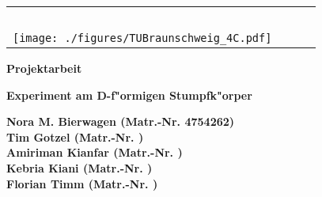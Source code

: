 \begin{titlepage}
 \centering

\begin{table}[htbp]
 \begin{center}
 \vspace{-0.5cm}
  \begin{tabular}{lcr} 
    \parbox{0.45\textwidth}{\mbox{ }} & \parbox{0.13\textwidth}{\mbox{ }} & \parbox{0.45\textwidth}{\mbox{ }} \\
    \hspace*{-2.0cm}
    \texttt{[image: ./figures/TUBraunschweig\_4C.pdf]} & 
     &  \\ %
  \end{tabular}
 \end{center}
\end{table}


 \vspace*{2.0cm}

 \textbf{\large Projektarbeit}


 \vspace*{1.5cm}
 
 \textbf{\LARGE Experiment am D-f"ormigen Stumpfk"orper} \\[0.5ex]
 


 \vspace*{1.5cm}

 \textbf{\large Nora M. Bierwagen (Matr.-Nr. 4754262)} \\
 \textbf{\large Tim Gotzel (Matr.-Nr. )} \\
 \textbf{\large Amiriman Kianfar (Matr.-Nr. )} \\
 \textbf{\large Kebria Kiani (Matr.-Nr. )} \\
 \textbf{\large Florian Timm (Matr.-Nr. )} \\


 \vspace*{7.0cm}


\end{titlepage}
